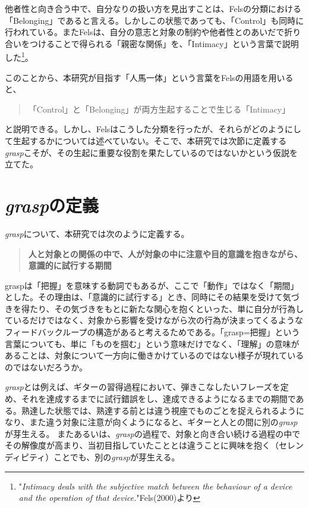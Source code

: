 他者性と向き合う中で、自分なりの扱い方を見出すことは、Felsの分類における「Belonging」であると言える。しかしこの状態であっても、「Control」も同時に行われている。またFelsは、自分の意志と対象の制約や他者性とのあいだで折り合いをつけることで得られる「親密な関係」を、「Intimacy」という言葉で説明した\footnote{"\textit{Intimacy deals with the subjective match between the behaviour of a device and the operation of that device.}"Fels(2000)\cite{Fels}より}。

このことから、本研究が目指す「人馬一体」という言葉をFelsの用語を用いると、
\begin{quote}
  「Control」と「Belonging」が両方生起することで生じる「Intimacy」
\end{quote}
と説明できる。しかし、Felsはこうした分類を行ったが、それらがどのようにして生起するかについては述べていない。そこで、本研究では次節に定義する\textit{grasp}こそが、その生起に重要な役割を果たしているのではないかという仮説を立てた。


\section{\textit{grasp}の定義}
\label{grasp_difinition}
\textit{grasp}について、本研究では次のように定義する。

\begin{quote}
  \textbf{人と対象との関係の中で、人が対象の中に注意や目的意識を抱きながら、意識的に試行する期間}
\end{quote}

graspは「把握」を意味する動詞でもあるが、ここで「動作」ではなく「期間」とした。その理由は、「意識的に試行する」とき、同時にその結果を受けて気づきを得たり、その気づきをもとに新たな関心を抱くといった、単に自分が行為しているだけではなく、対象から影響を受けながら次の行為が決まってくるようなフィードバックループの構造があると考えるためである。「grasp=把握」という言葉についても、単に「ものを掴む」という意味だけでなく、「理解」の意味があることは、対象について一方向に働きかけているのではない様子が現れているのではないだろうか。

\textit{grasp}とは例えば、ギターの習得過程において、弾きこなしたいフレーズを定め、それを達成するまでに試行錯誤をし、達成できるようになるまでの期間である。熟達した状態では、熟達する前とは違う視座でものごとを捉えられるようになり、また違う対象に注意が向くようになると、ギターと人との間に別の\textit{grasp}が芽生える。
またあるいは、\textit{grasp}の過程で、対象と向き合い続ける過程の中でその解像度が高まり、当初目指していたこととは違うことに興味を抱く（セレンディピティ）ことでも、別の\textit{grasp}が芽生える。

